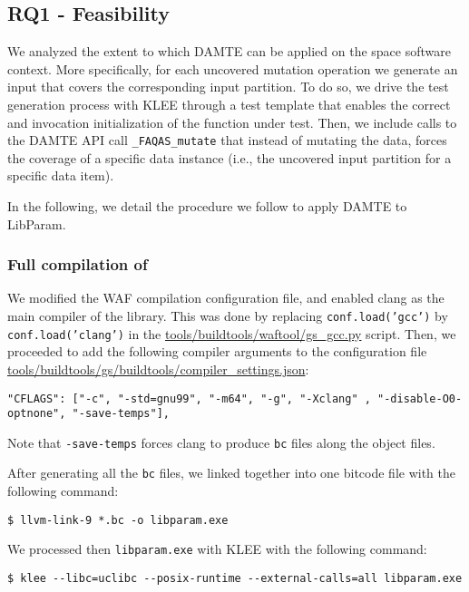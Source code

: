 \subsection{RQ1 - Feasibility}

We analyzed the extent to which DAMTE can be applied on the space software context. More specifically, for each uncovered mutation operation we generate an input that covers the corresponding input partition. To do so, we drive the test generation process with KLEE through a test template that enables the correct and invocation initialization of the function under test. Then, we include calls to the DAMTE API call \texttt{\_FAQAS\_mutate} that instead of mutating the data, forces the coverage of a specific data instance (i.e., the uncovered input partition for a specific data item).

In the following, we detail the procedure we follow to apply DAMTE to LibParam.

\subsubsection{Full compilation of \PARAM}

We modified the WAF compilation configuration file, and enabled clang as the main compiler of the library. This was done by replacing \texttt{conf.load('gcc')} by \texttt{conf.load('clang')} in the \url{tools/buildtools/waftool/gs_gcc.py} script.
Then, we proceeded to add the following compiler arguments to the configuration file \url{tools/buildtools/gs/buildtools/compiler_settings.json}:


\begin{lstlisting}[style=CStyle]
"CFLAGS": ["-c", "-std=gnu99", "-m64", "-g", "-Xclang" , "-disable-O0-optnone", "-save-temps"],
\end{lstlisting}

Note that \texttt{-save-temps} forces clang to produce \texttt{bc} files along the object files.

After generating all the \texttt{bc} files, we linked together into one bitcode file with the following command:

\begin{lstlisting}[style=CStyle]
$ llvm-link-9 *.bc -o libparam.exe
\end{lstlisting}

We processed then \texttt{libparam.exe} with KLEE with the following command:

\begin{lstlisting}[style=CStyle]
$ klee --libc=uclibc --posix-runtime --external-calls=all libparam.exe
\end{lstlisting}

